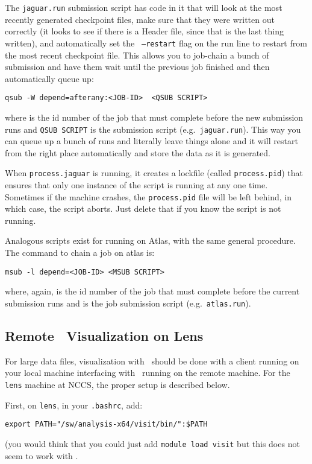 The {\tt jaguar.run} submission script has code in it that will look
at the most recently generated checkpoint files, make sure that they
were written out correctly (it looks to see if there is a Header file,
since that is the last thing written), and automatically set the {\tt
  --restart} flag on the run line to restart from the most recent
checkpoint file.  This allows you to job-chain a bunch of submission
and have them wait until the previous job finished and then
automatically queue up:
\begin{verbatim}
qsub -W depend=afterany:<JOB-ID>  <QSUB SCRIPT>
\end{verbatim}
where {\tt <JOB-ID>} is the id number of the job that must complete
before the new submission runs and {\tt QSUB SCRIPT} is the submission
script (e.g.\ {\tt jaguar.run}).
This way you can queue up a bunch of runs and literally leave things
alone and it will restart from the right place automatically and store
the data as it is generated.

When {\tt process.jaguar} is running, it creates a lockfile (called
{\tt process.pid}) that ensures that only one instance of the script
is running at any one time.  Sometimes if the machine crashes, the
{\tt process.pid} file will be left behind, in which case, the script
aborts.  Just delete that if you know the script is not running.

Analogous scripts exist for running on Atlas, with the same general
procedure.  The command to chain a job on atlas is:
\begin{verbatim}
msub -l depend=<JOB-ID> <MSUB SCRIPT>
\end{verbatim}
where, again, {\tt <JOB-ID>} is the id number of the job that must
complete before the current submission runs and {\tt <MSUB SCRIPT>}
is the job submission script (e.g.\ {\tt atlas.run}).


\subsection{Remote \visit\ Visualization on Lens}

For large data files, visualization with \visit\ should be done with
a client running on your local machine interfacing with \visit\ running
on the remote machine.  For the {\tt lens} machine at NCCS, the proper setup
is described below.

First, on {\tt lens}, in your {\tt .bashrc}, add:
\begin{verbatim}
export PATH="/sw/analysis-x64/visit/bin/":$PATH
\end{verbatim}
(you would think that you could just add {\tt module load visit} but this
does not seem to work with \visit.

